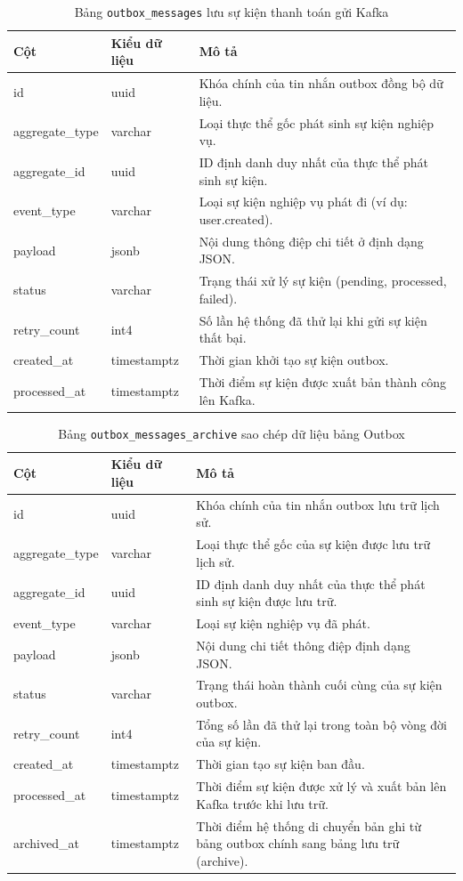 \begin{table}[H]
\centering
\begin{tabular}{|l|l|p{6cm}|}
\hline
\textbf{Cột} & \textbf{Kiểu dữ liệu} & \textbf{Mô tả} \\ \hline
id & uuid & Khóa chính của tin nhắn outbox đồng bộ dữ liệu. \\ \hline
aggregate\_type & varchar & Loại thực thể gốc phát sinh sự kiện nghiệp vụ. \\ \hline
aggregate\_id & uuid & ID định danh duy nhất của thực thể phát sinh sự kiện. \\ \hline
event\_type & varchar & Loại sự kiện nghiệp vụ phát đi (ví dụ: user.created). \\ \hline
payload & jsonb & Nội dung thông điệp chi tiết ở định dạng JSON. \\ \hline
status & varchar & Trạng thái xử lý sự kiện (pending, processed, failed). \\ \hline
retry\_count & int4 & Số lần hệ thống đã thử lại khi gửi sự kiện thất bại. \\ \hline
created\_at & timestamptz & Thời gian khởi tạo sự kiện outbox. \\ \hline
processed\_at & timestamptz & Thời điểm sự kiện được xuất bản thành công lên Kafka. \\ \hline
\end{tabular}
\caption{Bảng \texttt{outbox\_messages} lưu sự kiện thanh toán gửi Kafka}
\end{table}

\begin{table}[H]
\centering
\begin{tabular}{|l|l|p{6cm}|}
\hline
\textbf{Cột} & \textbf{Kiểu dữ liệu} & \textbf{Mô tả} \\ \hline
id & uuid & Khóa chính của tin nhắn outbox lưu trữ lịch sử. \\ \hline
aggregate\_type & varchar & Loại thực thể gốc của sự kiện được lưu trữ lịch sử. \\ \hline
aggregate\_id & uuid & ID định danh duy nhất của thực thể phát sinh sự kiện được lưu trữ. \\ \hline
event\_type & varchar & Loại sự kiện nghiệp vụ đã phát. \\ \hline
payload & jsonb & Nội dung chi tiết thông điệp định dạng JSON. \\ \hline
status & varchar & Trạng thái hoàn thành cuối cùng của sự kiện outbox. \\ \hline
retry\_count & int4 & Tổng số lần đã thử lại trong toàn bộ vòng đời của sự kiện. \\ \hline
created\_at & timestamptz & Thời gian tạo sự kiện ban đầu. \\ \hline
processed\_at & timestamptz & Thời điểm sự kiện được xử lý và xuất bản lên Kafka trước khi lưu trữ. \\ \hline
archived\_at & timestamptz & Thời điểm hệ thống di chuyển bản ghi từ bảng outbox chính sang bảng lưu trữ (archive). \\ \hline
\end{tabular}
\caption{Bảng \texttt{outbox\_messages\_archive} sao chép dữ liệu bảng Outbox}
\end{table}
